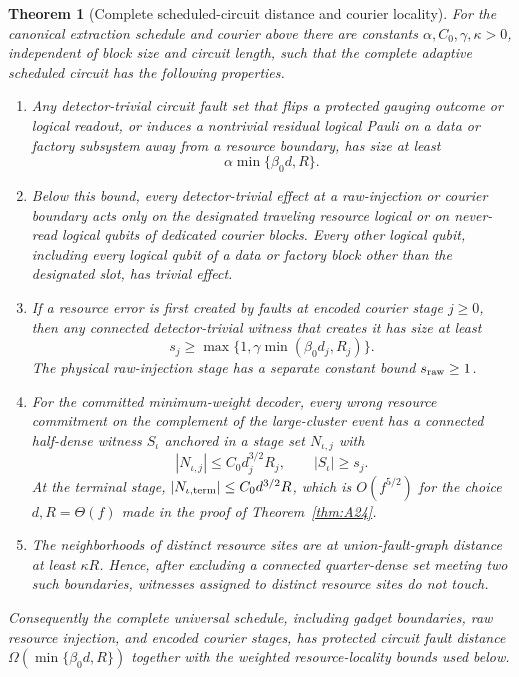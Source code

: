 \documentclass[aps,prx,reprint,superscriptaddress,nofootinbib,floatfix,longbibliography]{revtex4-2}
\newtheorem{theorem}{Theorem}[section]
\theoremstyle{definition}
\begin{document}
\begin{theorem}[Complete scheduled-circuit distance and courier locality]
\label{thm:A16}
For the canonical extraction schedule and courier above there are constants
$\alpha,C_0,\gamma,\kappa>0$, independent of block size and circuit length,
such that the complete adaptive scheduled circuit has the following
properties.
\begin{enumerate}
\item Any detector-trivial circuit fault set that flips a protected gauging
outcome or logical readout, or induces a nontrivial residual logical Pauli on
a data or factory subsystem away from a resource boundary, has size at least
\begin{equation}
 \alpha\min\{\beta_0d,R\}.                                        \tag{A16}
\end{equation}
\item Below this bound, every detector-trivial effect at a raw-injection or
courier boundary acts only on the designated traveling resource logical or
on never-read logical qubits of dedicated courier blocks.  Every other
logical qubit, including every logical qubit of a data or factory block
other than the designated slot, has trivial effect.
\item If a resource error is first created by faults at encoded courier stage
$j\geq0$, then any connected detector-trivial witness that creates it has
size at least
\begin{equation}
 s_j\geq\max\{1,\gamma\min(\beta_0d_j,R_j)\}.                     \tag{A17}
\end{equation}
The physical raw-injection stage has a separate constant bound
$s_{\rm raw}\geq1$.
\item For the committed minimum-weight decoder, every wrong resource
commitment on the complement of the large-cluster event has a connected
half-dense witness $S_\iota$ anchored in a stage set $N_{\iota,j}$ with
\begin{equation}
 |N_{\iota,j}|\leq C_0d_j^{3/2}R_j,
 \qquad |S_\iota|\geq s_j.                                       \tag{A17a}
\end{equation}
At the terminal stage, $|N_{\iota,{\rm term}}|\leq C_0d^{3/2}R$, which is $O(f^{5/2})$ for the choice $d,R=\Theta(f)$ made in the proof of Theorem~\ref{thm:A24}.
\item The neighborhoods of distinct resource sites are at union-fault-graph
distance at least $\kappa R$.  Hence, after excluding a connected
quarter-dense set meeting two such boundaries, witnesses assigned to distinct
resource sites do not touch.
\end{enumerate}
Consequently the complete universal schedule, including gadget boundaries,
raw resource injection, and encoded courier stages, has protected circuit
fault distance $\Omega(\min\{\beta_0d,R\})$ together with the weighted
resource-locality bounds used below.
\end{theorem}
\end{document}
